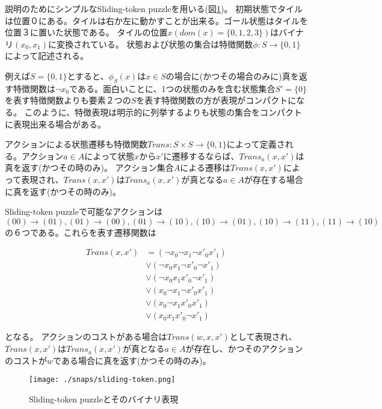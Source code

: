 説明のためにシンプルなSliding-token puzzleを用いる(図\ref{fig:sliding-token})。
初期状態でタイルは位置０にある。タイルは右か左に動かすことが出来る。ゴール状態はタイルを位置３に置いた状態である。
タイルの位置$x (dom(x) = \{0,1,2,3\})$はバイナリ$(x_0,x_1)$に変換されている。
状態および状態の集合は特徴関数$\phi: S \rightarrow \{0, 1\}$によって記述される。



例えば$S = \{0, 1\}$とすると、$\phi_{S}(x)$は$x \in S$の場合に(かつその場合のみに)真を返す特徴関数は$\lnot x_0$である。面白いことに、1つの状態のみを含む状態集合$S' = \{0\}$を表す特徴関数よりも要素２つの$S$を表す特徴関数の方が表現がコンパクトになる。
このように、特徴表現は明示的に列挙するよりも状態の集合をコンパクトに表現出来る場合がある。

アクションによる状態遷移も特徴関数$Trans: S \times S \rightarrow \{0, 1\}$によって定義される。アクション$a \in A$によって状態$x$から$x'$に遷移するならば、$Trans_a(x,x')$は真を返す(かつその時のみ)。
アクション集合$A$による遷移は$Trans(x,x')$によって表現され、$Trans(x,x')$は$Trans_a(x,x')$が真となる$a \in A$が存在する場合に真を返す(かつその時のみ)。

Sliding-token puzzleで可能なアクションは$(00) \rightarrow (01), (01) \rightarrow (00), (01) \rightarrow (10), (10) \rightarrow (01), (10) \rightarrow (11), (11) \rightarrow (10)$の６つである。これらを表す遷移関数は

\begin{equation}
\begin{split}
	Trans(x,x') &= (\lnot x_0 \lnot x_1 \lnot x'_0 x'_1) \\
		&\lor (\lnot x_0 x_1 \lnot x'_0 \lnot x'_1) \\
		&\lor (\lnot x_0 x_1 x'_0 \lnot x'_1) \\
		&\lor (x_0 \lnot x_1 \lnot x'_0 x'_1) \\
		&\lor (x_0 \lnot x_1 x'_0 x'_1) \\
		&\lor (x_0 x_1 x'_0 \lnot x'_1)
\end{split}
\end{equation}

となる。
アクションのコストがある場合は$Trans(w, x, x')$として表現され、$Trans(x,x')$は$Trans_a(x,x')$が真となる$a \in A$が存在し、かつそのアクションのコストが$w$である場合に真を返す(かつその時のみ)。



\begin{figure}
\centering
\texttt{[image: ./snaps/sliding-token.png]}
\caption{Sliding-token puzzleとそのバイナリ表現}
\label{fig:sliding-token}
\end{figure}

